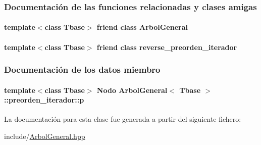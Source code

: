 \subsubsection{Documentación de las funciones relacionadas y clases amigas}
\hypertarget{classArbolGeneral_1_1preorden__iterador_a9c06e31b7c3e0d4ee5b03003d32935a5}{
\paragraph[{Arbol\-General}]{\setlength{\rightskip}{0pt plus 5cm}template$<$class Tbase$>$ friend class {\bf Arbol\-General}\hspace{0.3cm}{\ttfamily [friend]}}}\label{classArbolGeneral_1_1preorden__iterador_a9c06e31b7c3e0d4ee5b03003d32935a5}
\hypertarget{classArbolGeneral_1_1preorden__iterador_ad7df6535fb84021c7c3804850af9fdcd}{
\paragraph[{reverse\-\_\-preorden\-\_\-iterador}]{\setlength{\rightskip}{0pt plus 5cm}template$<$class Tbase$>$ friend class {\bf reverse\-\_\-preorden\-\_\-iterador}\hspace{0.3cm}{\ttfamily [friend]}}}\label{classArbolGeneral_1_1preorden__iterador_ad7df6535fb84021c7c3804850af9fdcd}


\subsubsection{Documentación de los datos miembro}
\hypertarget{classArbolGeneral_1_1preorden__iterador_afac01ba5fdc1e10c2a808d92f1dbddaf}{
\paragraph[{p}]{\setlength{\rightskip}{0pt plus 5cm}template$<$class Tbase$>$ {\bf Nodo} {\bf Arbol\-General}$<$ Tbase $>$\-::preorden\-\_\-iterador\-::p\hspace{0.3cm}{\ttfamily [private]}}}\label{classArbolGeneral_1_1preorden__iterador_afac01ba5fdc1e10c2a808d92f1dbddaf}


La documentación para esta clase fue generada a partir del siguiente fichero\-:\begin{DoxyCompactItemize}
\item 
include/\hyperlink{ArbolGeneral_8hpp}{Arbol\-General.\-hpp}\end{DoxyCompactItemize}
